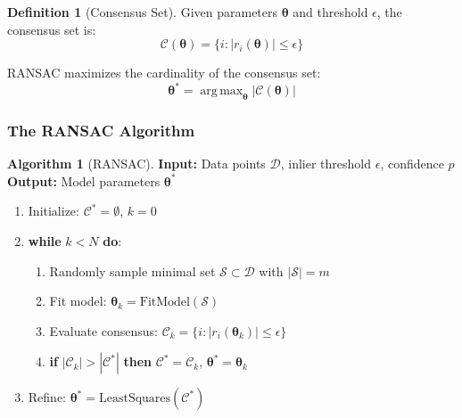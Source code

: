 \documentclass[12pt]{article}
\DeclareMathOperator{\argmax}{arg\,max}
\renewcommand{\vec}[1]{\mathbf{#1}}
\newcommand{\abs}[1]{\left| #1 \right|}
\theoremstyle{definition}
\newtheorem{definition}{Definition}[section]
\newtheorem{algorithm}{Algorithm}[section]
\begin{document}
\begin{definition}[Consensus Set]
    Given parameters $\vec{\theta}$ and threshold $\epsilon$, the consensus set is:
    \begin{equation}
        \mathcal{C}(\vec{\theta}) = \{i : \abs{r_i(\vec{\theta})} \leq \epsilon\}
    \end{equation}
\end{definition}

RANSAC maximizes the cardinality of the consensus set:
\begin{equation}
    \vec{\theta}^* = \argmax_{\vec{\theta}} \abs{\mathcal{C}(\vec{\theta})}
\end{equation}

\subsubsection{The RANSAC Algorithm}

\begin{algorithm}[RANSAC] \label{alg:ransac}
    \textbf{Input:} Data points $\mathcal{D}$, inlier threshold $\epsilon$, confidence $p$ \\
    \textbf{Output:} Model parameters $\vec{\theta}^*$

    \begin{enumerate}
        \item Initialize: $\mathcal{C}^* = \emptyset$, $k = 0$

        \item \textbf{while} $k < N$ \textbf{do}:
              \begin{enumerate}[label=(\alph*)]
                  \item Randomly sample minimal set $\mathcal{S} \subset \mathcal{D}$ with $\abs{\mathcal{S}} = m$
                  \item Fit model: $\vec{\theta}_k = \text{FitModel}(\mathcal{S})$
                  \item Evaluate consensus: $\mathcal{C}_k = \{i : \abs{r_i(\vec{\theta}_k)} \leq \epsilon\}$
                  \item \textbf{if} $\abs{\mathcal{C}_k} > \abs{\mathcal{C}^*}$ \textbf{then} $\mathcal{C}^* = \mathcal{C}_k$, $\vec{\theta}^* = \vec{\theta}_k$
              \end{enumerate}

        \item Refine: $\vec{\theta}^* = \text{LeastSquares}(\mathcal{C}^*)$
    \end{enumerate}
\end{algorithm}
\end{document}
